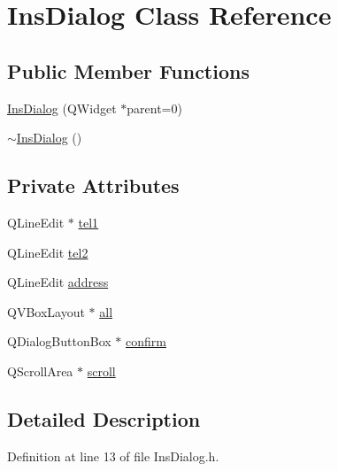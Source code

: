 \hypertarget{class_ins_dialog}{\section{Ins\+Dialog Class Reference}
\label{class_ins_dialog}
}
\subsection*{Public Member Functions}
\begin{DoxyCompactItemize}
\item 
\hyperlink{class_ins_dialog_a4a3cd89b0f67e2ef788333272106125a}{Ins\+Dialog} (Q\+Widget $\ast$parent=0)
\item 
\hyperlink{class_ins_dialog_a9c15fe45d3d2c9eaa484df2213b791e2}{$\sim$\+Ins\+Dialog} ()
\end{DoxyCompactItemize}
\subsection*{Private Attributes}
\begin{DoxyCompactItemize}
\item 
Q\+Line\+Edit $\ast$ \hyperlink{class_ins_dialog_a2edd5f0fce0dcc6f12c4f8cd391b5fc0}{tel1}
\item 
Q\+Line\+Edit \hyperlink{class_ins_dialog_a80b1bd54ec9e97020280559e6b5532db}{tel2}
\item 
Q\+Line\+Edit \hyperlink{class_ins_dialog_acd23e80138ee75cc27dd87dff5457ba9}{address}
\item 
Q\+V\+Box\+Layout $\ast$ \hyperlink{class_ins_dialog_ab8de5f3cd72b44a3b3524fc52bac148c}{all}
\item 
Q\+Dialog\+Button\+Box $\ast$ \hyperlink{class_ins_dialog_aa77dfa096f7cd3bc82823f6944ecbd8b}{confirm}
\item 
Q\+Scroll\+Area $\ast$ \hyperlink{class_ins_dialog_a822e0887cf9597f75ed5c4a772a8c9db}{scroll}
\end{DoxyCompactItemize}


\subsection{Detailed Description}


Definition at line 13 of file Ins\+Dialog.\+h.



